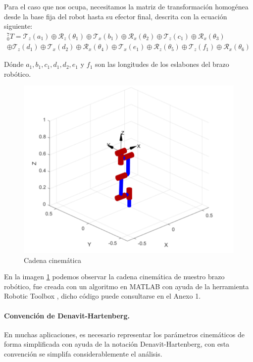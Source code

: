 Para el caso que nos ocupa, necesitamos la matriz de transformación homogénea desde la base fija del robot hasta su efector final, descrita con la ecuación siguiente:
\begin{equation}
\label{eq:homogeneustransformationmatrix}
\begin{split}
{}_{0}^{7}T = \mathscr{T}_z(a_1)\oplus\mathscr{R}_z(\theta_1)\oplus\mathscr{T}_x(b_1)\oplus\mathscr{R}_x(\theta_2)\oplus\mathscr{T}_z(c_1)\oplus\mathscr{R}_x(\theta_3) \\ \oplus\mathscr{T}_z(d_1)\oplus\mathscr{T}_x(d_2)\oplus\mathscr{R}_x(\theta_4)\oplus\mathscr{T}_x(e_1)\oplus\mathscr{R}_z(\theta_5)\oplus\mathscr{T}_z(f_1)\oplus\mathscr{R}_x(\theta_6)
\end{split}
\end{equation}

Dónde $a_1, b_1, c_1, d_1, d_2, e_1$ y $f_1$ son las longitudes de los eslabones del brazo robótico. 

\begin{figure}
    \centering
    \includegraphics[scale=0.6]{./img/chapter4/KinematicDiagramML.png}
    \caption{Cadena cinemática}
    \label{fig:kinematicchain}
\end{figure}


En la imagen \ref{fig:kinematicchain} podemos observar la cadena cinemática de nuestro brazo robótico, fue creada con un algoritmo en MATLAB con ayuda de la herramienta Robotic Toolbox \cite{Corke2017}, dicho código puede consultarse en el Anexo 1.


\paragraph{Convención de Denavit-Hartenberg.} En muchas aplicaciones, es necesario representar los parámetros cinemáticos de forma simplificada con ayuda de la notación Denavit-Hartenberg, con esta convención se simplifa considerablemente el análisis.


